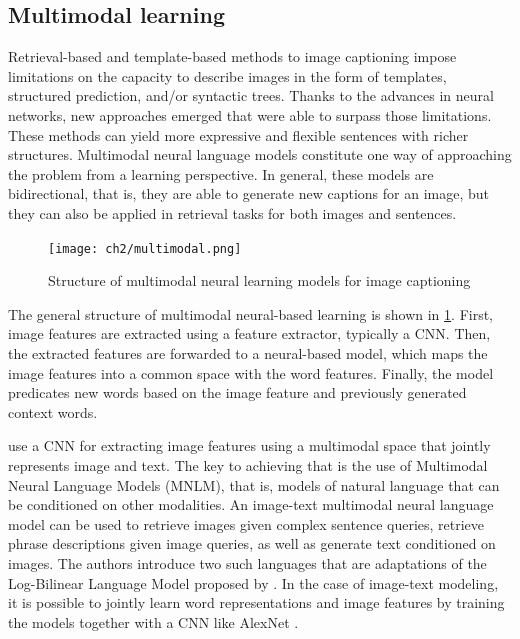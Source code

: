 \subsection{Multimodal learning}\label{subsec:multimodal-learning}

Retrieval-based and template-based methods to image captioning impose limitations on the capacity to describe images in the form of templates, structured prediction, and/or syntactic trees. Thanks to the advances in neural networks, new approaches emerged that were able to surpass those limitations. These methods can yield more expressive and flexible sentences with richer structures.  Multimodal neural language models constitute one way of approaching the problem from a learning perspective. In general, these models are bidirectional, that is, they are able to generate new captions for an image, but they can also be applied in retrieval tasks for both images and sentences.

\begin{figure}[hpt]
    \centering
    \texttt{[image: ch2/multimodal.png]}
    \caption{Structure of multimodal neural learning models for image captioning}
    \label{fig:multimodal}
\end{figure}

The general structure of multimodal neural-based learning is shown in \cref{fig:multimodal}. First, image features are extracted using a feature extractor, typically a CNN. Then, the extracted features are forwarded to a neural-based model, which maps the image features into a common space with the word features. Finally, the model predicates new words based on the image feature and previously generated context words.

\citet{Kiros2014_VS} use a CNN for extracting image features using a multimodal space that jointly represents image and text. The key to achieving that is the use of Multimodal Neural Language Models (MNLM), that is, models of natural language that can be conditioned on other modalities. An image-text multimodal neural language model can be used to retrieve images given complex sentence queries, retrieve phrase descriptions given image queries, as well as generate text conditioned on images. The authors introduce two such languages that are adaptations of the Log-Bilinear Language Model proposed by \citet{Mnih2007}. In the case of image-text modeling, it is possible to jointly learn word representations and image features by training the models together with a CNN like AlexNet \citep{Krizhevsky2012}.


